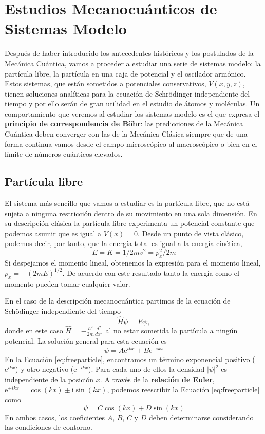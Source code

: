 \chapter{Estudios Mecanocuánticos de Sistemas Modelo}
Después de haber introducido los antecedentes históricos y los
postulados de la Mecánica Cuántica, vamos a proceder a 
estudiar una serie de sistemas modelo: la partícula libre, la
partícula en una caja de potencial y el oscilador armónico.
Estos sistemas, que están sometidos a potenciales conservativos,
$V(x,y,z)$, tienen soluciones analíticas para la ecuación 
de Schrödinger independiente del tiempo y por ello serán de gran
utilidad en el estudio de átomos y moléculas. Un comportamiento
que veremos al estudiar los sistemas modelo es el que expresa
el \textbf{principio de correspondencia de Böhr}:
las predicciones de la Mecánica Cuántica deben converger con 
las de la Mecánica Clásica siempre que de una forma continua vamos 
desde el campo microscópico al macroscópico o bien en el límite   
de números cuánticos elevados.

\section{Partícula libre}
El sistema más sencillo que vamos a estudiar es la partícula libre,
que no está sujeta a ninguna restricción dentro de su movimiento
en una sola dimensión. En su descripción clásica la partícula libre
experimenta un potencial constante que podemos asumir que es igual a
$V(x)=0$. Desde un punto de vista clásico, podemos decir, por tanto,
que la energía total es igual a la energía cinética,
\begin{equation}
    E=K=1/2mv^2=p_x^2/2m
\end{equation}
Si despejamos el momento lineal, obtenemos la expresión para el
momento lineal, $p_x=\pm(2mE)^{1/2}$. De acuerdo con este resultado
tanto la energía como el momento pueden tomar cualquier valor.

En el caso de la descripción mecanocuántica partimos de 
la ecuación de Schödinger independiente del tiempo
\begin{equation}
    \hat{H}\psi=E\psi,
\end{equation}
donde en este caso $\hat{H}=-\frac{\hbar^2}{2m}\frac{d^2}{dx^2}$ al
no estar sometida la partícula a ningún potencial. La solución
general para esta ecuación es
\begin{equation}
    \psi = A\mathrm{e}^{ikx}+ B\mathrm{e}^{-ikx}\label{eq:freeparticle}
\end{equation}
En la Ecuación \ref{eq:freeparticle}, encontramos un término
exponencial positivo ($\mathrm{e}^{ikx}$) y otro negativo 
($\mathrm{e}^{-ikx}$). Para cada uno de ellos la densidad 
$|\psi|^2$ es independiente de la posición $x$.
A través de la \textbf{relación de Euler}, 
$\mathrm{e}^{\pm ikx}=\cos(kx)\pm\mathrm{i}\sin(kx)$, podemos reescribir
la Ecuación \ref{eq:freeparticle} como
\begin{equation}
    \psi=C\cos(kx) + D\sin(kx) \label{eq:freepangular}
\end{equation}
En ambos casos, los coeficientes
$A$, $B$, $C$ y $D$ deben determinarse considerando las condiciones
de contorno.

